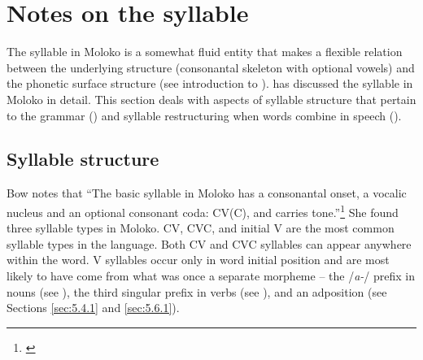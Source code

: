 \begin{table}
\caption{High tone lowering at morpheme boundaries\label{tab:2.14}}
\end{table}

\section{Notes on the syllable}\label{sec:2.5}
\hypertarget{RefHeading1210681525720847}{}
The syllable in Moloko is a somewhat fluid entity that makes a flexible relation between the underlying structure (consonantal skeleton with optional vowels) and the phonetic surface structure (see introduction to ). \citet{Bow1997c} has discussed the syllable in Moloko in detail. This section deals with aspects of syllable structure that pertain to the grammar () and syllable restructuring when words combine in speech (). 

\subsection{Syllable structure}\label{sec:2.5.1}
\hypertarget{RefHeading1210701525720847}{}
Bow notes that “The basic syllable in Moloko has a consonantal onset, a vocalic nucleus and an optional consonant coda: CV(C), and carries tone.”\footnote{\citealt[1]{Bow1997c}} She found three syllable types in Moloko.  CV, CVC, and initial V are the most common syllable types in the language.  Both CV and CVC syllables can appear anywhere within the word. V syllables occur only in word initial position and are most likely to have come from what was once a separate morpheme -- the /\textit{a-}/ prefix in nouns (see ), the third singular prefix in verbs (see ), and an adposition (see Sections \ref{sec:5.4.1} and \ref{sec:5.6.1}).

